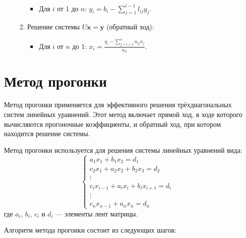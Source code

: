 \documentclass{article}
\begin{document}
\begin{enumerate}
\begin{enumerate}
        \begin{itemize}
            \item Для \(i\) от 1 до \(n\): \(y_i = b_i - \sum_{j=1}^{i-1} l_{ij} y_j\).
        \end{itemize}
        \item Решение системы \(U\mathbf{x} = \mathbf{y}\) (обратный ход):
        \begin{itemize}
            \item Для \(i\) от \(n\) до 1: \(x_i = \frac{y_i - \sum_{j=i+1}^{n} u_{ij} x_j}{u_{ii}}\).
        \end{itemize}
    \end{enumerate}
\end{enumerate}
\section{Метод прогонки}
Метод прогонки применяется для эффективного решения трёхдиагональных систем линейных уравнений. Этот метод включает прямой ход, в ходе которого вычисляются прогоночные коэффициенты, и обратный ход, при котором находится решение системы.

Метод прогонки используется для решения системы линейных уравнений вида:
\[
\begin{cases}
a_1 x_1 + b_1 x_2 = d_1 \\
c_2 x_1 + a_2 x_2 + b_2 x_3 = d_2 \\
\vdots \\
c_i x_{i-1} + a_i x_i + b_i x_{i+1} = d_i \\
\vdots \\
c_n x_{n-1} + a_n x_n = d_n
\end{cases}
\]
где \(a_i\), \(b_i\), \(c_i\) и \(d_i\) — элементы лент матрицы.

Алгоритм метода прогонки состоит из следующих шагов:
\end{document}
